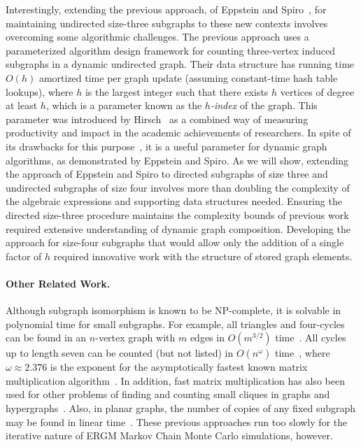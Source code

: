 \documentclass[11pt]{article}
\renewcommand{\subsection}[1]{\paragraph{\textbf{#1}.}}
\begin{document}
Interestingly, extending the previous approach, of 
Eppstein and Spiro~\cite{es-hgadss-09},
for maintaining undirected size-three subgraphs to these new contexts involves
overcoming some algorithmic challenges.
The previous approach uses a parameterized algorithm
design framework for counting three-vertex induced 
subgraphs in a dynamic undirected graph. Their data structure
has running time $O(h)$ amortized time per graph
update (assuming constant-time hash table lookups), 
where $h$ is the largest integer such that there exists
$h$ vertices of degree at least $h$, which is a parameter 
known as the \emph{$h$-index} of the graph.
This parameter was introduced by Hirsch~\cite{Hir-PNAS-05} as a combined
way of measuring productivity and
impact in the academic achievements of researchers. 
\ifFull
In spite of its
drawbacks for this purpose~\cite{AdlEwiTay-JCQAR-08}, it is a useful
parameter for dynamic graph algorithms, as demonstrated 
by Eppstein and Spiro.
\fi
As we will show,
extending the approach of Eppstein and Spiro to directed
subgraphs of size three and undirected subgraphs of size four involves
more than doubling the 
complexity of the algebraic expressions and supporting data structures needed.
Ensuring the directed size-three procedure maintains the complexity bounds of 
previous work required extensive understanding of dynamic graph composition.  Developing 
the approach for size-four subgraphs that would allow only the addition of a single 
factor of $h$ required innovative work with the structure of stored graph elements.


\subsection{Other Related Work}
Although subgraph isomorphism is known to be NP-complete,
it is solvable in polynomial time for small subgraphs.
For example, all triangles and four-cycles can be found 
in an $n$-vertex graph with $m$ edges 
in $O(m^{3/2})$ time~\cite{ItaRod-SJC-78,ChiNis-SICOMP-85}. 
All cycles up to length seven can be counted (but not listed) in 
$O(n^\omega)$ time~\cite{AloYusZwi-Algo-97},
where $\omega\approx 2.376$ is the exponent for the asymptotically 
fastest known matrix multiplication algorithm~\cite{CopWin-JSC-90}.
\ifFull
In addition,
fast matrix multiplication has also been used for other problems of finding
and counting small cliques in graphs and
hypergraphs~\cite{EisGra-TCS-04,KloKraMue-IPL-00,NesPol-CMUC-85,VasWil-STOC-09,Yus-IPL-06}.
\fi
Also, in planar graphs, 
the number of copies of any fixed subgraph may be found in linear
time~\cite{Epp-JGAA-99,Epp-Algo-00}.
These previous approaches run too slowly for the iterative nature of
ERGM Markov Chain Monte Carlo simulations, however.
\end{document}
